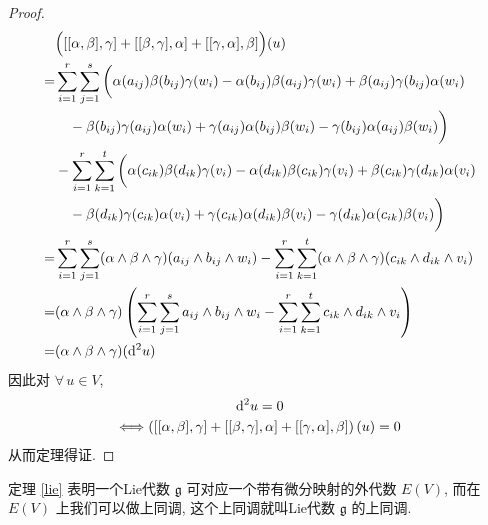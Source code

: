 \begin{proof}
\begin{align*}
            &\Big([[\alpha,\beta],\gamma]+[[\beta,\gamma],\alpha]+[[\gamma,\alpha],\beta]\Big)(u) \\
            =&\sum_{i=1}^{r}\sum_{j=1}^{s}\bigg(\alpha(a_{ij})\beta(b_{ij})\gamma(w_i)-\alpha(b_{ij})\beta(a_{ij})\gamma(w_i)+\beta(a_{ij})\gamma(b_{ij})\alpha(w_i) \\
            &\quad-\beta(b_{ij})\gamma(a_{ij})\alpha(w_i)+\gamma(a_{ij})\alpha(b_{ij})\beta(w_i)-\gamma(b_{ij})\alpha(a_{ij})\beta(w_i)\bigg) \\
            &-\sum_{i=1}^{r}\sum_{k=1}^{t}\bigg(\alpha(c_{ik})\beta(d_{ik})\gamma(v_i)-\alpha(d_{ik})\beta(c_{ik})\gamma(v_i)+\beta(c_{ik})\gamma(d_{ik})\alpha(v_i) \\
            &\quad-\beta(d_{ik})\gamma(c_{ik})\alpha(v_i)+\gamma(c_{ik})\alpha(d_{ik})\beta(v_i)-\gamma(d_{ik})\alpha(c_{ik})\beta(v_i)\bigg) \\
            =&\sum_{i=1}^{r}\sum_{j=1}^{s}(\alpha\wedge\beta\wedge\gamma)(a_{ij}\wedge b_{ij}\wedge w_i)-\sum_{i=1}^{r}\sum_{k=1}^{t}(\alpha\wedge\beta\wedge\gamma)(c_{ik}\wedge d_{ik}\wedge v_i) \\
            =&(\alpha\wedge\beta\wedge\gamma)\left(\sum_{i=1}^{r}\sum_{j=1}^{s}a_{ij}\wedge b_{ij}\wedge w_i-\sum_{i=1}^{r}\sum_{k=1}^{t}c_{ik}\wedge d_{ik}\wedge v_i\right) \\
            =&(\alpha\wedge\beta\wedge\gamma)({\rm d}^2 u)
        \end{align*}
        因此对 $\forall\,u\in V$,
        \begin{gather*}
            {\rm d}^2 u = 0 \\
            \Longleftrightarrow \left([[\alpha,\beta],\gamma]+[[\beta,\gamma],\alpha]+[[\gamma,\alpha],\beta]\right)(u) = 0
        \end{gather*}
        从而定理得证.
    \end{proof}
    定理 \ref{lie} 表明一个{\rm Lie}代数 $\mathfrak{g}$ 可对应一个带有微分映射的外代数 $E(V)$, 而在 $E(V)$ 上我们可以做上同调,
    这个上同调就叫{\rm Lie}代数 $\mathfrak{g}$ 的上同调.
